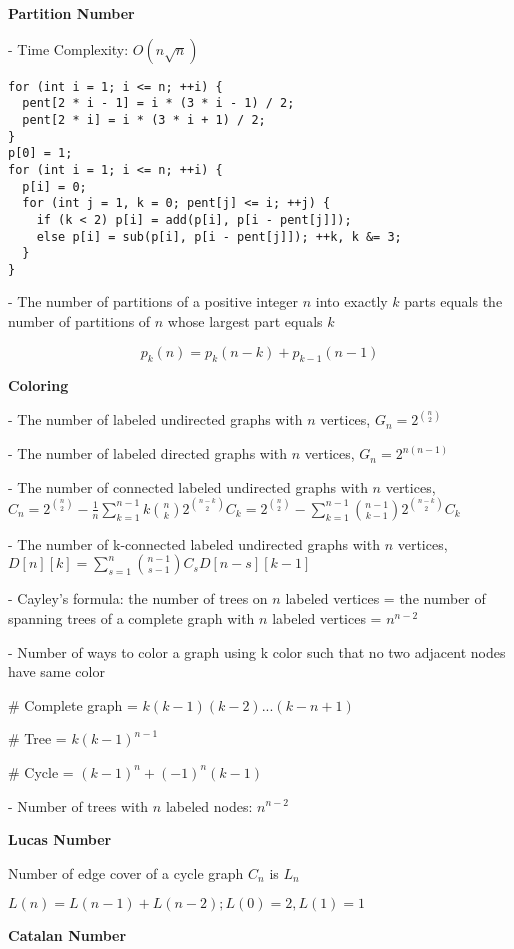 \textbf{Partition Number}

- Time Complexity: $ O(n\sqrt{n}) $
\begin{verbatim}
for (int i = 1; i <= n; ++i) {
  pent[2 * i - 1] = i * (3 * i - 1) / 2;
  pent[2 * i] = i * (3 * i + 1) / 2;
}
p[0] = 1;
for (int i = 1; i <= n; ++i) {
  p[i] = 0;
  for (int j = 1, k = 0; pent[j] <= i; ++j) {
    if (k < 2) p[i] = add(p[i], p[i - pent[j]]);
    else p[i] = sub(p[i], p[i - pent[j]]); ++k, k &= 3;
  }
}
\end{verbatim}
- The number of partitions of a positive integer \( n \) into exactly \( k \) parts equals the number of partitions of \( n \) whose largest part equals \( k \)

\[ p_k(n) = p_k(n - k) + p_{k - 1}(n - 1) \]

\textbf{Coloring}

- The number of labeled undirected graphs with \( n \) vertices, \( G_n = 2^{\binom{n}{2}} \)

- The number of labeled directed graphs with \( n \) vertices, \( G_n = 2^{n(n - 1)} \)

- The number of connected labeled undirected graphs with \( n \) vertices, \( C_n = 2^{\binom{n}{2}} - \frac{1}{n} \sum_{k = 1}^{n - 1} k \binom{n}{k} 2^{\binom{n-k}{2}}C_k = 2^{\binom{n}{2}} - \sum_{k = 1}^{n - 1} \binom{n - 1}{k - 1} 2^{\binom{n-k}{2}}C_k \)

- The number of k-connected labeled undirected graphs with \( n \) vertices, \( D[n][k] = \sum_{s = 1}^{n} \binom{n - 1}{s- 1}C_s D[n - s][k - 1] \)

- Cayley's formula: the number of trees on \( n \) labeled vertices = the number of spanning trees of a complete graph with \( n \) labeled vertices = \( n^{n - 2} \)

- Number of ways to color a graph using k color such that no two adjacent nodes have same color

  # Complete graph = \( k(k-1)(k-2)...(k-n+1) \)

  # Tree = \( k(k - 1)^{n - 1} \)

  # Cycle = \( (k - 1)^n + (-1)^n (k - 1) \)

- Number of trees with $ n $ labeled nodes: $ n^{n - 2} $

\textbf{Lucas Number}

Number of edge cover of a cycle graph $ C_n $ is $ L_n $

$ L(n) = L(n-1) + L(n-2); L(0)=2, L(1)=1 $

\textbf{Catalan Number}

